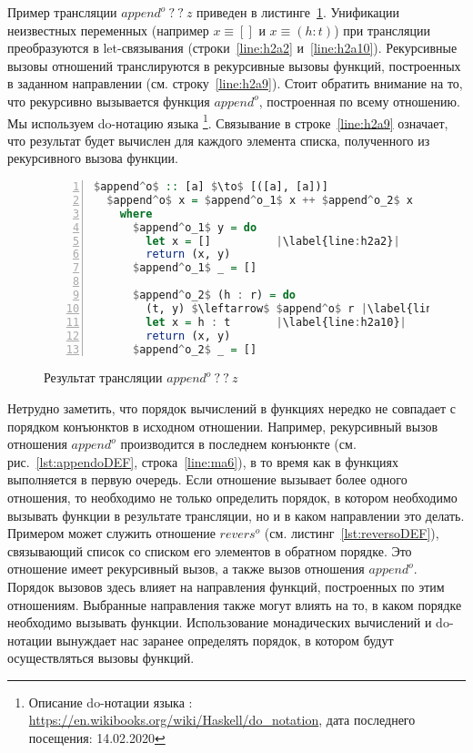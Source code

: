 \documentclass[conference,american,russian]{IEEEtran}
\begin{document}
Пример трансляции $append^o \ ? \ ? \ z$ приведен в листинге~\ref{lst:appendoBWD}.  
Унификации неизвестных переменных (например $x \equiv []$ и $x \equiv (h : t)$) при трансляции преобразуются в let-связывания (строки~\ref{line:h2a2} и~\ref{line:h2a10}). 
Рекурсивные вызовы отношений транслируются в рекурсивные вызовы функций, построенных в заданном направлении (см. строку~\ref{line:h2a9}).
Стоит обратить внимание на то, что рекурсивно вызывается функция $append^o$, построенная по всему отношению.
Мы используем do-нотацию языка \haskell{}\footnote{Описание do-нотации языка \haskell{}: \url{https://en.wikibooks.org/wiki/Haskell/do\_notation}, дата последнего посещения: 14.02.2020}.
Связывание в строке~\ref{line:h2a9} означает, что результат будет вычислен для каждого элемента списка, полученного из рекурсивного вызова функции.

\begin{figure}[h!]
  \begin{center}
  \begin{minipage}{0.4\textwidth}
    \begin{lstlisting}[language=Haskell, frame=single, numbers=left,numberstyle=\small, escapechar=|]
  $append^o$ :: [a] $\to$ [([a], [a])]
  $append^o$ x = $append^o_1$ x ++ $append^o_2$ x
    where
      $append^o_1$ y = do
        let x = []          |\label{line:h2a2}|
        return (x, y)
      $append^o_1$ _ = []
      
      $append^o_2$ (h : r) = do
        (t, y) $\leftarrow$ $append^o$ r |\label{line:h2a9}|
        let x = h : t       |\label{line:h2a10}|
        return (x, y)
      $append^o_2$ _ = []
      \end{lstlisting}
  \end{minipage}
  \end{center}
  \caption{Результат трансляции $append^o \ ? \ ? \ z$ }
  \label{lst:appendoBWD}
\end{figure}

Нетрудно заметить, что порядок вычислений в функциях нередко не совпадает с порядком конъюнктов в исходном отношении. 
Например, рекурсивный вызов отношения $append^o$ производится в последнем конъюнкте (см. рис.~\ref{lst:appendoDEF}, строка~\ref{line:ma6}), в то время как в функциях выполняется в первую очередь. 
Если отношение вызывает более одного отношения, то необходимо не только определить порядок, в котором необходимо вызывать функции в результате трансляции, но и в каком направлении это делать. 
Примером может служить отношение $revers^o$ (см. листинг~\ref{lst:reversoDEF}), связывающий список со списком его элементов в обратном порядке.
Это отношение имеет рекурсивный вызов, а также вызов отношения $append^o$. 
Порядок вызовов здесь влияет на направления функций, построенных по этим отношениям.
Выбранные направления также могут влиять на то, в каком порядке необходимо вызывать функции. 
Использование монадических вычислений и do-нотации вынуждает нас заранее определять порядок, в котором будут осуществляться вызовы функций. 
\end{document}
